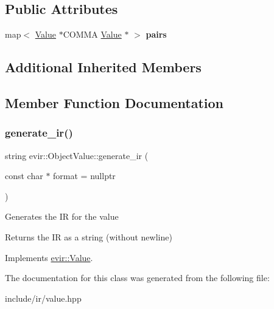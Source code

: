 \subsection*{Public Attributes}
\begin{DoxyCompactItemize}
\item 
\mbox{\label{classevir_1_1ObjectValue_ac6d2cd6efe7cbc645aa4d5bcbb16b749}} 
map$<$ \hyperlink{classevir_1_1Value}{Value} $\ast$C\+O\+M\+MA \hyperlink{classevir_1_1Value}{Value} $\ast$ $>$ {\bfseries pairs}
\end{DoxyCompactItemize}
\subsection*{Additional Inherited Members}


\subsection{Member Function Documentation}
\mbox{\label{classevir_1_1ObjectValue_a1058f47731ab800327893e388fc2b2d0}} 
\subsubsection{\texorpdfstring{generate\+\_\+ir()}{generate\_ir()}}
{\footnotesize\ttfamily string evir\+::\+Object\+Value\+::generate\+\_\+ir (\begin{DoxyParamCaption}\item[{const char $\ast$}]{format = {\ttfamily nullptr} }\end{DoxyParamCaption})\hspace{0.3cm}{\ttfamily [virtual]}}

Generates the IR for the value \begin{DoxyReturn}{Returns}
the IR as a string (without newline) 
\end{DoxyReturn}


Implements \hyperlink{classevir_1_1Value_a3e7e5bc634fd5bba528324076fe2a763}{evir\+::\+Value}.



The documentation for this class was generated from the following file\+:\begin{DoxyCompactItemize}
\item 
include/ir/value.\+hpp\end{DoxyCompactItemize}
